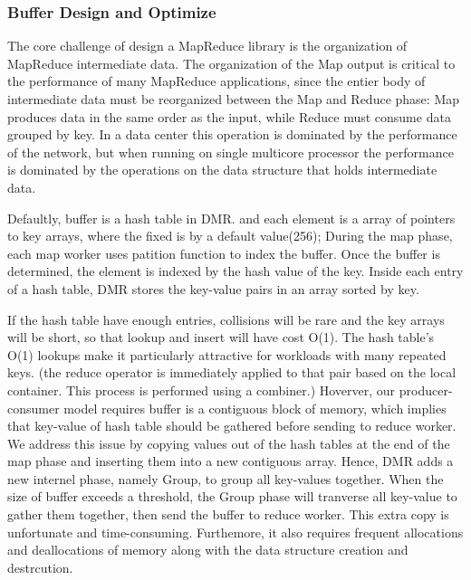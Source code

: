 \subsubsection{Buffer Design and Optimize}
The core challenge of design a MapReduce library 
is the organization of MapReduce
intermediate data.
The organization of the Map output is critical to the
performance of many MapReduce applications, 
since the entier body of intermediate data must be
reorganized between the Map and Reduce phase:
Map produces data in the same order as the input,
while Reduce must consume data grouped by key.\cite{mao2010metis}
In a data center this operation is dominated by
the performance of the network, but when running 
on single multicore processor the performance
is dominated by the operations on the data structure
that holds intermediate data.


Defaultly, buffer is a hash table in DMR.
and each element is a array of pointers to key arrays,
where the fixed is by a default value(256);
During the map phase, each map worker uses patition function
to index the buffer.
Once the buffer is determined, 
the element is indexed by the hash value of the key.
Inside each entry of a hash table,
DMR stores the key-value pairs in an array sorted by key.

If the hash table have enough entries, 
collisions will be rare and the key arrays will be short,
so that lookup and insert will have cost O(1).
The hash table's O(1) lookups make it
particularly attractive for workloads with many repeated keys.
{\color{green}(the reduce operator is immediately applied
to that pair based on the local container. This process is
performed using a combiner.)}
Hoverver, our producer-consumer model requires
buffer is a contiguous block of memory, 
which implies that key-value of hash table should be gathered
before sending to reduce worker.
We address this issue by copying values out of the hash tables
at the end of the map phase and inserting them into a new contiguous array.
Hence, DMR adds a new internel phase, namely Group,
to group all key-values together.
When the size of buffer exceeds a threshold,
the Group phase will tranverse all key-value to gather them together,
then send the buffer to reduce worker.
This extra copy is unfortunate and time-consuming.
Furthemore, it also requires frequent allocations
and deallocations of memory 
along with the data structure creation and destrcution.

